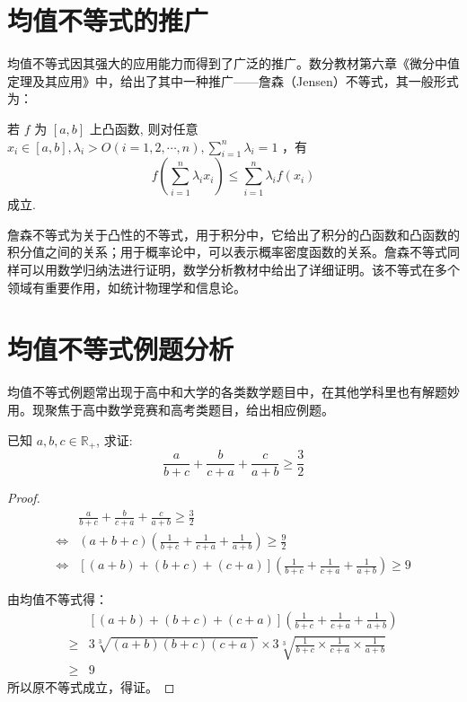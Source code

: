 \section{均值不等式的推广}

均值不等式因其强大的应用能力而得到了广泛的推广。数分教材第六章《微分中值定理及其应用》中，给出了其中一种推广——詹森（Jensen）不等式，其一般形式为：

\begin{theorem}
  \parencite{华东师大数学分析}
  若 $f$ 为 $[a, b]$ 上凸函数, 则对任意 $x_{i} \in[a, b], \lambda_{i}>O(i=
1,2, \cdots, n), \sum_{i=1}^{n} \lambda_{i}=1$ ，有 \[ f\left(\sum_{i=1}^{n} \lambda_{i} x_{i}\right) \leq \sum_{i=1}^{n} \lambda_{i} f\left(x_{i}\right)
\]
成立.
\end{theorem}


詹森不等式为关于凸性的不等式，用于积分中，它给出了积分的凸函数和凸函数的积分值之间的关系；用于概率论中，可以表示概率密度函数的关系。詹森不等式同样可以用数学归纳法进行证明，数学分析教材中给出了详细证明。该不等式在多个领域有重要作用，如统计物理学和信息论。



\section{均值不等式例题分析}

均值不等式例题常出现于高中和大学的各类数学题目中，在其他学科里也有解题妙用。现聚焦于高中数学竞赛和高考类题目，给出相应例题。

\begin{example}
  已知 $a, b, c \in \mathbb{R}_{+}$, 求证: \[\frac{a}{b+c}+\frac{b}{c+a}+\frac{c}{a+b} \geq \frac{3}{2}\]
\end{example}

\begin{proof}
  \begin{align*}
    & \frac{a}{b+c}+\frac{b}{c+a}+\frac{c}{a+b} \geq \frac{3}{2} \\
    \Leftrightarrow  & (a+b+c)\left(\frac{1}{b+c}+\frac{1}{c+a}+\frac{1}{a+b}\right) \geq \frac{9}{2} \\
    \Leftrightarrow  & [(a+b)+(b+c)+(c+a)]\left(\frac{1}{b+c}+\frac{1}{c+a}+\frac{1}{a+b}\right) \geq 9 
  \end{align*}

  由均值不等式得：
  \begin{align*}
    & [(a+b)+(b+c)+(c+a)]\left(\frac{1}{b+c}+\frac{1}{c+a}+\frac{1}{a+b}\right)\\
    \geq & 3 \sqrt[3]{(a+b)(b+c)(c+a)} \times 3 \sqrt[3]{\frac{1}{b+c} \times \frac{1}{c+a} \times \frac{1}{a+b}} \\
    \geq & 9
  \end{align*}
  所以原不等式成立，得证。
\end{proof}

